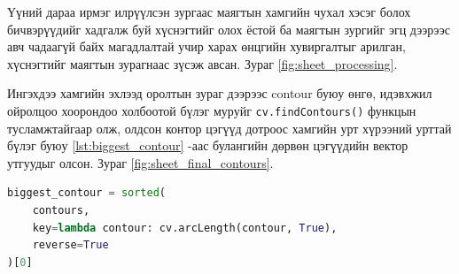 Үүний дараа ирмэг илрүүлсэн зургаас маягтын хамгийн чухал хэсэг болох бичвэрүүдийг хадгалж буй хүснэгтийг олох ёстой ба маягтын зургийг эгц дээрээс авч чадаагүй байх магадлалтай учир харах өнцгийн хувиргалтыг арилган, хүснэгтийг маягтын зурагнаас зүсэж авсан. Зураг \ref{fig:sheet_processing}.

Ингэхдээ хамгийн эхлээд оролтын зураг дээрээс contour буюу өнгө, идэвхжил ойролцоо хоорондоо холбоотой бүлэг муруйг \texttt{cv.findContours()} функцын тусламжтайгаар олж, олдсон контор цэгүүд дотроос хамгийн урт хүрээний урттай бүлэг буюу \ref{lst:biggest_contour} -аас булангийн дөрвөн цэгүүдийн вектор утгуудыг олсон. Зураг \ref{fig:sheet_final_contours}.

\begin{lstlisting}[caption={Хамгийн урт контор цэгүүд буюу энэ тохиолдолд бичвэр хадгалж буй хүснэгтийн ирмэг дээрх цэгүүд}, label={lst:biggest_contour}, language=Python]
biggest_contour = sorted(
	contours, 
	key=lambda contour: cv.arcLength(contour, True), 
	reverse=True
)[0]
\end{lstlisting}


